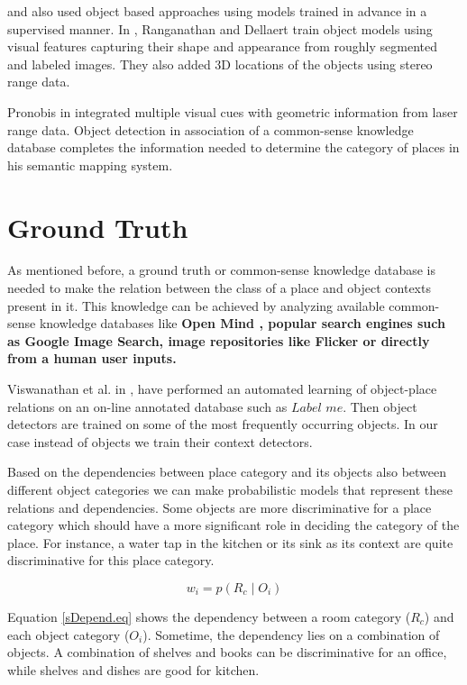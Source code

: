 \cite{ranganathan2007semantic} and \cite{P.Viswanathan} also used object based approaches using models trained in 
advance in a supervised manner. 
In \cite{ranganathan2007semantic}, Ranganathan and Dellaert train object models using visual features capturing their 
shape and appearance from roughly segmented and labeled images. 
They also added 3D locations of the objects using stereo range data.
 
Pronobis in \cite{pronobis2011phd} integrated multiple visual cues with geometric information from laser range data. 
Object detection in association of a common-sense knowledge database completes the information needed to determine the category of places in his semantic mapping system.
 
\section{Ground Truth}
\label{GroundTruth.sec}
As mentioned before, a ground truth or common-sense knowledge database is needed to make the relation between the class of a place and object contexts present in it.
This knowledge can be achieved by analyzing available common-sense knowledge databases like \bf{Open Mind} \cite{OpenMind}, popular search engines such as Google Image Search, image repositories like Flicker or directly from a human user inputs. 

Viswanathan et al. in \cite{P.Viswanathan}, have performed an automated learning of object-place relations on an on-line annotated database such as $Label$ $me$. 
Then object detectors are trained on some of the most frequently occurring objects.
In our case instead of objects we train their context detectors.

Based on the dependencies between place category and its objects also between different object categories we can make 
probabilistic models that represent these relations and dependencies.
Some objects are more discriminative for a place category which should have a more significant role in deciding the 
category of the place.
For instance, a water tap in the kitchen or its sink as its context are quite discriminative for this place category.

\begin{equation}
 \label{sDepend.eq}
 w_i = p(R_c \mid O_i) 
\end{equation}

Equation \ref{sDepend.eq} shows the dependency between a room category ($R_c$) and each object category ($O_i$).
Sometime, the dependency lies on a combination of objects.
A combination of shelves and books can be discriminative for an office, while shelves and dishes are good for kitchen.

